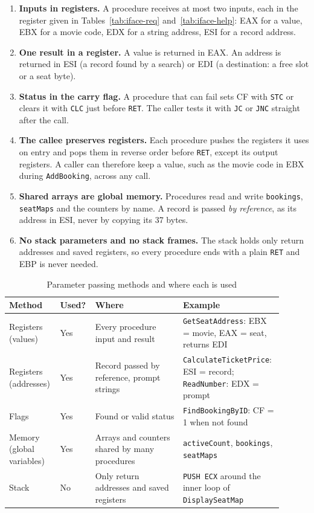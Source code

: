 \documentclass{thesis-library}
\newcommand{\tablefont}{\footnotesize\setstretch{1.15}\hyphenpenalty=10000\relax}
\begin{document}
\begin{enumerate}
\item \textbf{Inputs in registers.} A procedure receives at most two inputs, each in the register given in Tables~\ref{tab:iface-req} and~\ref{tab:iface-help}: EAX for a value, EBX for a movie code, EDX for a string address, ESI for a record address.
\item \textbf{One result in a register.} A value is returned in EAX. An address is returned in ESI (a record found by a search) or EDI (a destination: a free slot or a seat byte).
\item \textbf{Status in the carry flag.} A procedure that can fail sets CF with \texttt{STC} or clears it with \texttt{CLC} just before \texttt{RET}. The caller tests it with \texttt{JC} or \texttt{JNC} straight after the call.
\item \textbf{The callee preserves registers.} Each procedure pushes the registers it uses on entry and pops them in reverse order before \texttt{RET}, except its output registers. A caller can therefore keep a value, such as the movie code in EBX during \texttt{AddBooking}, across any call.
\item \textbf{Shared arrays are global memory.} Procedures read and write \texttt{bookings}, \texttt{seatMaps} and the counters by name. A record is passed \emph{by reference}, as its address in ESI, never by copying its 37 bytes.
\item \textbf{No stack parameters and no stack frames.} The stack holds only return addresses and saved registers, so every procedure ends with a plain \texttt{RET} and EBP is never needed.
\end{enumerate}

\begin{table}[H]
\centering
\tablefont
\caption{Parameter passing methods and where each is used}
\label{tab:passing}
\begin{tabular}{|L{0.17\linewidth}|L{0.11\linewidth}|L{0.31\linewidth}|L{0.31\linewidth}|}
\hline
\textbf{Method} & \textbf{Used?} & \textbf{Where} & \textbf{Example} \\
\hline
Registers (values) & Yes & Every procedure input and result & \texttt{GetSeatAddress}: EBX = movie, EAX = seat, returns EDI \\
\hline
Registers (addresses) & Yes & Record passed by reference, prompt strings & \texttt{CalculateTicketPrice}: ESI = record; \texttt{ReadNumber}: EDX = prompt \\
\hline
Flags & Yes & Found or valid status & \texttt{FindBookingByID}: CF = 1 when not found \\
\hline
Memory (global variables) & Yes & Arrays and counters shared by many procedures & \texttt{activeCount}, \texttt{bookings}, \texttt{seatMaps} \\
\hline
Stack & No & Only return addresses and saved registers & \texttt{PUSH ECX} around the inner loop of \texttt{DisplaySeatMap} \\
\hline
\end{tabular}
\end{table}
\end{document}

